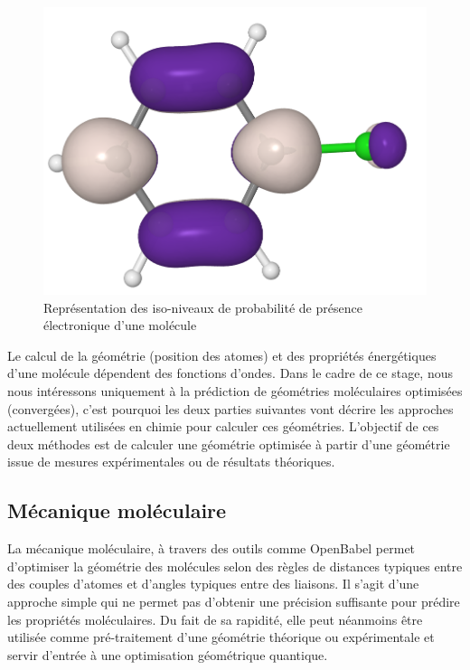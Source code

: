 \begin{figure}[!h]
	\centering
	\includegraphics[scale=0.25]{images/iso_niveaux.png}
	\caption{Représentation des iso-niveaux de probabilité de présence électronique d'une molécule}
\end{figure}

\par Le calcul de la géométrie (position des atomes) et des propriétés énergétiques d'une molécule dépendent des fonctions d'ondes. Dans le cadre de ce stage, nous nous intéressons uniquement à la prédiction de géométries moléculaires optimisées (convergées), c'est pourquoi les deux parties suivantes vont décrire les approches actuellement utilisées en chimie pour calculer ces géométries. L'objectif de ces deux méthodes est de calculer une géométrie optimisée à partir d'une géométrie issue de mesures expérimentales ou de résultats théoriques.

\subsection{Mécanique moléculaire}
La mécanique moléculaire, à travers des outils comme OpenBabel\cite{openbabel} permet d'optimiser la géométrie des molécules selon des règles de distances typiques entre des couples d'atomes et d'angles typiques entre des liaisons. Il s'agit d'une approche simple qui ne permet pas d'obtenir une précision suffisante pour prédire les propriétés moléculaires. Du fait de sa rapidité, elle peut néanmoins être utilisée comme pré-traitement d'une géométrie théorique ou expérimentale et servir d'entrée à une optimisation géométrique quantique. 

